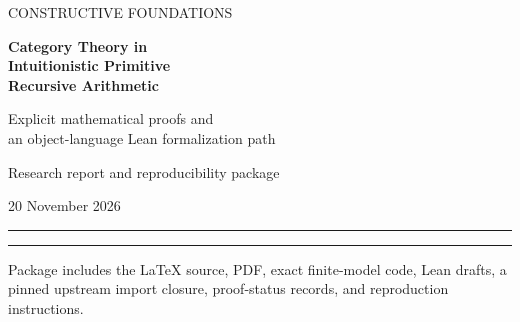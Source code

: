 \documentclass[11pt,a4paper]{article}
\theoremstyle{plain}
\theoremstyle{definition}
\theoremstyle{remark}
\numberwithin{equation}{section}
\begin{document}
\hypersetup{pageanchor=false}
\begin{titlepage}
\thispagestyle{empty}
\setlength{\parindent}{0pt}
\vspace*{17mm}
{\Large\color{accent}\sffamily CONSTRUCTIVE FOUNDATIONS\par}
\vspace{9mm}
{\Huge\bfseries\color{ink}Category Theory in\\[3mm]
Intuitionistic Primitive\\[3mm]Recursive Arithmetic\par}
\vspace{9mm}
{\Large Explicit mathematical proofs and\\[2mm]
an object-language Lean formalization path\par}
\vspace{12mm}
{\large Research report and reproducibility package\par}
\vspace{2mm}
{\large 20 November 2026\par}
\vfill
\noindent\rule{\linewidth}{0.6pt}
\begin{abstract}
A substantial structural core of category theory can be developed in
first-order intuitionistic primitive recursive arithmetic by fixing
arithmetic object and hom predicates, an arithmetic equivalence on
parallel arrows, and primitive recursive code operations. The proofs
may use undecidable equality formulas while remaining finite
intuitionistic derivations. We give full human-readable proofs of
Yoneda, representability and density; selected finite limits and colimits;
adjunctions, preservation and split equivalences; idempotent completion;
monads, Kleisli and Eilenberg--Moore constructions; pointwise Kan
extensions under explicit hypotheses; and a constructive diagonal
theorem. Uniform finite-table algorithms separately provide all finite
limits, colimits and exponentials, including empty sets.
The report distinguishes iPRA statements from external schemas,
selected structure from bare existence, and reused upstream
proof source from new uncompiled Lean integration drafts.
\end{abstract}
\noindent\rule{\linewidth}{0.6pt}\par
\vspace{3mm}
{\small\color{ink}
Package includes the \LaTeX{} source, PDF, exact finite-model code,
Lean drafts, a pinned upstream import closure, proof-status records,
and reproduction instructions.\par}
\end{titlepage}
\hypersetup{pageanchor=true}
\tableofcontents
\clearpage










\clearpage
{}
{}

\end{document}
